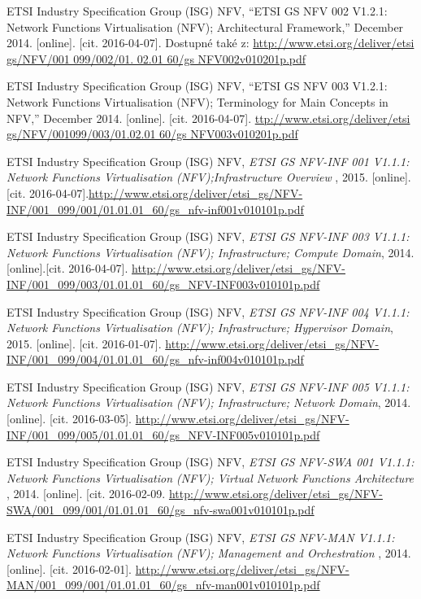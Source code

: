 \begin{thebibliography}{10}

ETSI Industry Specification Group (ISG) NFV, “ETSI GS NFV 002 V1.2.1: Network Functions Virtualisation (NFV); Architectural Framework,” December 2014. [online]. [cit. 2016-04-07]. Dostupné také z: \url{http://www.etsi.org/deliver/etsi gs/NFV/001 099/002/01. 02.01 60/gs NFV002v010201p.pdf} 

ETSI Industry Specification Group (ISG) NFV, “ETSI GS NFV 003 V1.2.1: Network Functions Virtualisation (NFV); Terminology for Main Concepts in NFV,” December 2014. [online]. [cit. 2016-04-07]. \url{ttp://www.etsi.org/deliver/etsi gs/NFV/001099/003/01.02.01 60/gs NFV003v010201p.pdf}

ETSI Industry Specification Group (ISG) NFV, \emph{ETSI GS NFV-INF 001 V1.1.1: Network Functions Virtualisation (NFV);Infrastructure Overview }, 2015. [online]. [cit. 2016-04-07].\url{http://www.etsi.org/deliver/etsi_gs/NFV-INF/001_099/001/01.01.01_60/gs_nfv-inf001v010101p.pdf}

ETSI Industry Specification Group (ISG) NFV, \emph{ETSI GS NFV-INF 003 V1.1.1: Network Functions Virtualisation (NFV);
Infrastructure; Compute Domain}, 2014. [online].[cit. 2016-04-07]. \url{http://www.etsi.org/deliver/etsi_gs/NFV-INF/001_099/003/01.01.01_60/gs_NFV-INF003v010101p.pdf}

 ETSI Industry Specification Group (ISG) NFV, \emph{ETSI GS NFV-INF 004 V1.1.1: Network Functions Virtualisation (NFV); Infrastructure; Hypervisor Domain}, 2015. [online]. [cit. 2016-01-07]. \url{http://www.etsi.org/deliver/etsi_gs/NFV-INF/001_099/004/01.01.01_60/gs_nfv-inf004v010101p.pdf}

 ETSI Industry Specification Group (ISG) NFV, \emph{ETSI GS NFV-INF 005 V1.1.1: Network Functions Virtualisation (NFV); Infrastructure; Network Domain}, 2014. [online]. [cit. 2016-03-05]. \url{http://www.etsi.org/deliver/etsi_gs/NFV-INF/001_099/005/01.01.01_60/gs_NFV-INF005v010101p.pdf}

 ETSI Industry Specification Group (ISG) NFV, \emph{ETSI GS NFV-SWA 001 V1.1.1: Network Functions Virtualisation (NFV); Virtual Network Functions Architecture  }, 2014. [online]. [cit. 2016-02-09. \url{http://www.etsi.org/deliver/etsi_gs/NFV-SWA/001_099/001/01.01.01_60/gs_nfv-swa001v010101p.pdf}

 ETSI Industry Specification Group (ISG) NFV, \emph{ETSI GS NFV-MAN V1.1.1: Network Functions Virtualisation (NFV);
Management and Orchestration }, 2014. [online]. [cit. 2016-02-01]. \url{http://www.etsi.org/deliver/etsi_gs/NFV-MAN/001_099/001/01.01.01_60/gs_nfv-man001v010101p.pdf}


\end{thebibliography}
